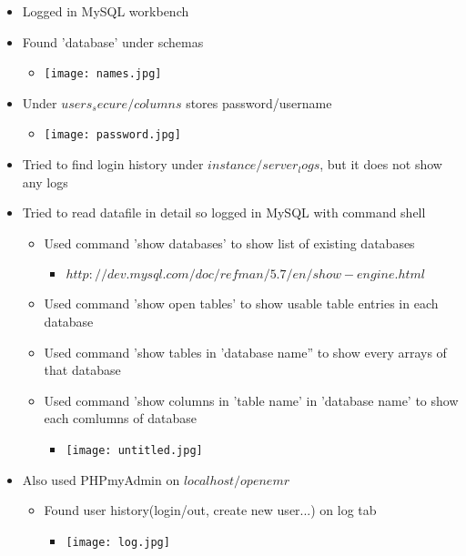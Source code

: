 \documentclass[paper=a4, fontsize=11pt]{scrartcl} %
\numberwithin{equation}{section} %
\numberwithin{figure}{section} %
\numberwithin{table}{section} %
\begin{document}
\begin{itemize}
\vspace{2cm}
		\item Logged in MySQL workbench
		\item Found 'database' under schemas
		\begin{itemize}
			\item
			\texttt{[image: names.jpg]}
		\end{itemize}
		\item Under $users_secure/columns$ stores password/username
		\begin{itemize}
			\item
			\texttt{[image: password.jpg]}
		\end{itemize}
		\item Tried to find login history under $instance/server_logs$, but it does not show any logs
		\item Tried to read datafile in detail so logged in MySQL with command shell
	\begin{itemize}
			\item Used command 'show databases' to show list of existing databases
				\begin{itemize}
			\item $http://dev.mysql.com/doc/refman/5.7/en/show-engine.html$
				\end{itemize}	
			\item Used command 'show open tables' to show usable table entries in each database
			\item Used command 'show tables in 'database name'' to show every arrays of that database
			\item Used command 'show columns in 'table name' in 'database name' to show each comlumns of database
			\begin{itemize}
				\item
				\texttt{[image: untitled.jpg]}
			\end{itemize}
	\end{itemize}
\vspace{10cm}
		\item Also used PHPmyAdmin on $localhost/openemr$
	\begin{itemize}
			\item Found user history(login/out, create new user...) on log tab
				\begin{itemize}
					\item
					\texttt{[image: log.jpg]}
			\end{itemize}	

\end{itemize}
\end{itemize}
\end{document}
